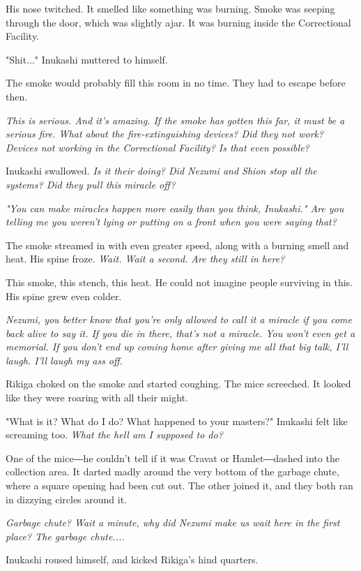 His nose twitched. It smelled like something was burning. Smoke was
seeping through the door, which was slightly ajar. It was burning inside
the Correctional Facility.

"Shit..." Inukashi muttered to himself.

The smoke would probably fill this room in no time. They had to escape
before then.

\emph{This is serious. And it's amazing. If the smoke has gotten this far, it
must be a serious fire. What about the fire-extinguishing devices? Did
they not work? Devices not working in the Correctional Facility? Is that
even possible?}

Inukashi swallowed. \emph{Is it their doing? Did Nezumi and Shion stop all the
systems? Did they pull this miracle off?}

\emph{"You can make miracles happen more easily than you think, Inukashi." Are
you telling me you weren't lying or putting on a front when you were
saying that?}

The smoke streamed in with even greater speed, along with a burning
smell and heat. His spine froze. \emph{Wait. Wait a second. Are they still in
here?}

This smoke, this stench, this heat. He could not imagine people
surviving in this. His spine grew even colder.

\emph{Nezumi, you better know that you're only allowed to call it a miracle if
you come back alive to say it. If you die in there, that's not a
miracle. You won't even get a memorial. If you don't end up coming home
after giving me all that big talk, I'll laugh. I'll laugh my ass off.}

Rikiga choked on the smoke and started coughing. The mice screeched. It
looked like they were roaring with all their might.

"What is it? What do I do? What happened to your masters?" Inukashi felt
like screaming too. \emph{What the hell am I supposed to do?}

One of the mice―he couldn't tell if it was Cravat or Hamlet―dashed into
the collection area. It darted madly around the very bottom of the
garbage chute, where a square opening had been cut out. The other joined
it, and they both ran in dizzying circles around it.

\emph{Garbage chute? Wait a minute, why did Nezumi make us wait here in the
first place? The garbage chute....}

Inukashi roused himself, and kicked Rikiga's hind quarters.

